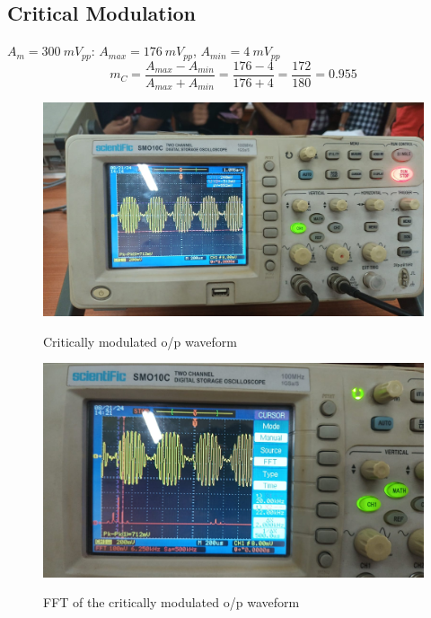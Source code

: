 \documentclass{article}
\begin{document}
\subsection{Critical Modulation}
$A_m=300\ mV_{pp}$: $A_{max}=176 \ mV_{pp}$, $A_{min}=4\ mV_{pp}$
\begin{equation}
  m_{C}=\frac{A_{max}-A_{min}}{A_{max}+A_{min}}=\frac{176-4}{176+4}=\frac{172}{180}=0.955
\end{equation}
\begin{figure}[!ht]
  \caption{Critically modulated o/p waveform}
\includegraphics[width=\textwidth]{Critical_Modulation.jpeg}
\label{fig:Critical_modulation}
\end{figure}

\begin{figure}[!ht]
  \caption{FFT of the critically modulated o/p waveform}
\includegraphics[width=\textwidth]{Critical_Modulation_FFT.jpeg}
\label{fig:Critical_modulation_FFT}
\end{figure}
\clearpage
\end{document}
